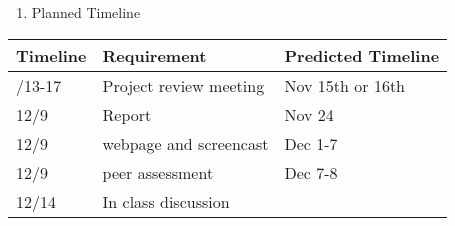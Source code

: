 \documentclass[
]{article}
\providecommand{\tightlist}{%
  \setlength{\itemsep}{0pt}\setlength{\parskip}{0pt}}
\begin{document}
\begin{enumerate}
\def\labelenumi{\arabic{enumi}.}
\setcounter{enumi}{7}
\tightlist
\item
  Planned Timeline
\end{enumerate}

\begin{longtable}[]{@{}lll@{}}
\toprule\noalign{}
Timeline & Requirement & Predicted Timeline \\
\midrule\noalign{}
\endhead
\bottomrule\noalign{}
\endlastfoot
11/13-17 & Project review meeting & Nov 15th or 16th \\
12/9 & Report & Nov 24 \\
12/9 & webpage and screencast & Dec 1-7 \\
12/9 & peer assessment & Dec 7-8 \\
12/14 & In class discussion & \\
\end{longtable}
\end{document}
